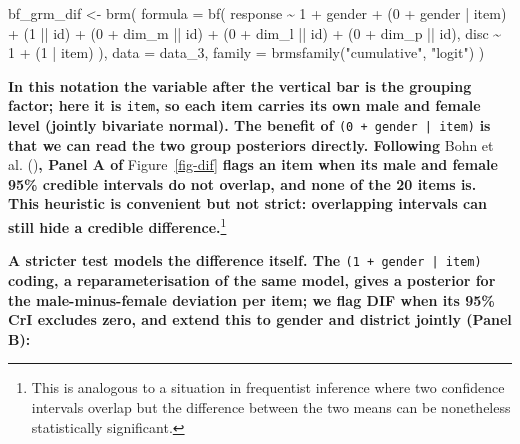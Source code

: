\documentclass[
  man,
  floatsintext,
  longtable,
  nolmodern,
  notxfonts,
  notimes,
  colorlinks=true,linkcolor=blue,citecolor=blue,urlcolor=blue]{apa7}
\newenvironment{Shaded}{\begin{snugshade}}{\end{snugshade}}
\newcommand{\AttributeTok}[1]{\textcolor[rgb]{0.40,0.45,0.13}{#1}}
\newcommand{\DecValTok}[1]{\textcolor[rgb]{0.68,0.00,0.00}{#1}}
\newcommand{\FunctionTok}[1]{\textcolor[rgb]{0.28,0.35,0.67}{#1}}
\newcommand{\NormalTok}[1]{\textcolor[rgb]{0.00,0.23,0.31}{#1}}
\newcommand{\OtherTok}[1]{\textcolor[rgb]{0.00,0.23,0.31}{#1}}
\newcommand{\SpecialCharTok}[1]{\textcolor[rgb]{0.37,0.37,0.37}{#1}}
\newcommand{\StringTok}[1]{\textcolor[rgb]{0.13,0.47,0.30}{#1}}
\newcommand{\rev}[1]{\textbf{\textcolor{revcol}{#1}}}  %
\begin{document}
\begin{Shaded}
\begin{Highlighting}[]
\NormalTok{bf\_grm\_dif }\OtherTok{\textless{}{-}} \FunctionTok{brm}\NormalTok{(}
  \AttributeTok{formula =} \FunctionTok{bf}\NormalTok{(}
\NormalTok{    response }\SpecialCharTok{\textasciitilde{}} \DecValTok{1} \SpecialCharTok{+}\NormalTok{ gender }\SpecialCharTok{+}\NormalTok{ (}\DecValTok{0} \SpecialCharTok{+}\NormalTok{ gender }\SpecialCharTok{|}\NormalTok{ item) }\SpecialCharTok{+}
\NormalTok{      (}\DecValTok{1} \SpecialCharTok{||}\NormalTok{ id) }\SpecialCharTok{+}\NormalTok{ (}\DecValTok{0} \SpecialCharTok{+}\NormalTok{ dim\_m }\SpecialCharTok{||}\NormalTok{ id) }\SpecialCharTok{+}
\NormalTok{      (}\DecValTok{0} \SpecialCharTok{+}\NormalTok{ dim\_l }\SpecialCharTok{||}\NormalTok{ id) }\SpecialCharTok{+}\NormalTok{ (}\DecValTok{0} \SpecialCharTok{+}\NormalTok{ dim\_p }\SpecialCharTok{||}\NormalTok{ id),}
\NormalTok{    disc }\SpecialCharTok{\textasciitilde{}} \DecValTok{1} \SpecialCharTok{+}\NormalTok{ (}\DecValTok{1} \SpecialCharTok{|}\NormalTok{ item)}
\NormalTok{  ),}
  \AttributeTok{data =}\NormalTok{ data\_3,}
  \AttributeTok{family =} \FunctionTok{brmsfamily}\NormalTok{(}\StringTok{"cumulative"}\NormalTok{, }\StringTok{"logit"}\NormalTok{)}
\NormalTok{)}
\end{Highlighting}
\end{Shaded}

\rev{In this notation the variable after the vertical bar is the grouping factor; here it is }\texttt{item}\rev{, so each item carries its own male and female level (jointly bivariate normal). The benefit of }\texttt{(0 + gender | item)}
\rev{ is that we can read the two group posteriors directly. Following}
Bohn et al. ()\rev{, Panel A of}
Figure~\ref{fig-dif}
\rev{flags an item when its male and female 95\% credible intervals do not overlap, and none of the 20 items is. This heuristic is convenient but not strict: overlapping intervals can still hide a credible difference.}\footnote{This
  is analogous to a situation in frequentist inference where two
  confidence intervals overlap but the difference between the two means
  can be nonetheless statistically significant.}

\rev{A stricter test models the difference itself. The }\texttt{(1 + gender | item)}\rev{ coding, a reparameterisation of the same model, gives a posterior for the male-minus-female deviation per item; we flag DIF when its 95\% CrI excludes zero, and extend this to gender and district jointly (Panel B):}
\end{document}
